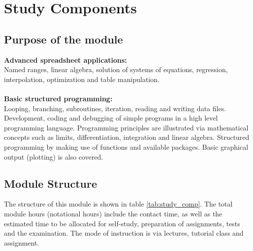 \section{Study Components}
    \subsection{Purpose of the module}
        {\bf Advanced spreadsheet applications:} \\
        Named ranges, linear algebra,
        solution of systems of equations, regression, interpolation,
        optimization and table manipulation. \\ \\
        {\bf Basic structured programming:} \\
        Looping, branching, subroutines, iteration, reading and writing data
        files. Development, coding and debugging of simple programs in a high
        level programming language. Programming principles are illustrated via
        mathematical concepts such as limits, differentiation, integration
        and linear algebra. Structured programming by making use of functions
        and available packages. Basic graphical output (plotting) is also
        covered.

    \subsection{Module Structure}
        The structure of this module is shown in table \ref{tab:study_comp}.
        The total module hours (notational hours) include the contact time,
        as well as the estimated time to be allocated for self-study,
        preparation of assignments, tests and the examination. The mode of
        instruction is via lectures, tutorial class and assignment.

